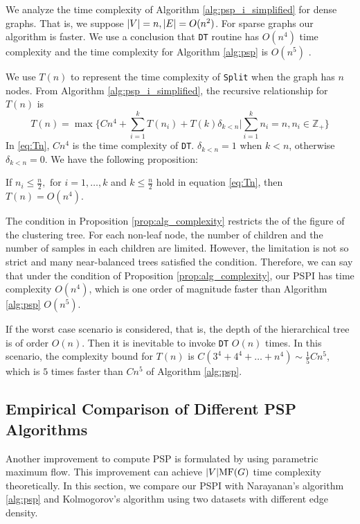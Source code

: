 We analyze the time complexity of Algorithm \ref{alg:psp_i_simplified} for dense graphs. That is, we suppose $\lvert V\rvert = n, \lvert E\rvert = O(n^2)$. For sparse graphs our algorithm is faster. We use a conclusion that \texttt{DT} routine has $O(n^4)$ time complexity and the time complexity for Algorithm \ref{alg:psp} is $O(n^5)$ \citep{pin}.

We use $T(n)$ to represent the time complexity of \texttt{Split} when the graph has $n$ nodes.
From Algorithm \ref{alg:psp_i_simplified}, the recursive relationship for $T(n)$ is
\begin{equation}\label{eq:Tn}
T(n) = \max \{ C n^4 + \sum_{i=1}^k T(n_i) + T(k)\delta_{k<n} | \sum_{i=1}^k n_i = n, n_i \in \mathbb{Z}_{+} \}
\end{equation}	
In \eqref{eq:Tn}, $Cn^4$ is the time complexity of \texttt{DT}. $\delta_{k<n} = 1$ when $k<n$, otherwise $\delta_{k<n}=0$. We have the following proposition:
\begin{proposition}\label{prop:alg_complexity}
	 If $n_i \leq \frac{n}{2}, \textrm{ for } i=1,\dots,k$ and $ k \leq \frac{n}{2}$  hold in equation \eqref{eq:Tn}, then $T(n) = O(n^4)$.
\end{proposition}

The condition in Proposition \ref{prop:alg_complexity} restricts the of the figure of the clustering tree. For each non-leaf node, the number of children and the number of samples in each children are limited. However, the limitation is not so strict and
many near-balanced trees satisfied the condition. Therefore, we can say that under the condition of Proposition \ref{prop:alg_complexity},
our PSPI has time complexity $O(n^4)$, which is one order of magnitude faster than Algorithm \ref{alg:psp} $O(n^5)$.

If the worst case scenario is considered, that is, the depth of the hierarchical tree is of order $O(n)$. Then it is inevitable to invoke \texttt{DT} $O(n)$ times.
In this scenario, the complexity bound for $T(n)$ is $C(3^4+4^4 + \dots + n^4) \sim \frac{1}{5}Cn^5$, which is $5$ times faster than $Cn^5$ of Algorithm \ref{alg:psp}.

\subsection{Empirical Comparison of Different PSP Algorithms}
Another improvement to compute PSP is formulated by \cite{kolmogorov} using parametric maximum flow.
This improvement can achieve $\lvert V\rvert \textrm{MF}(G)$ time complexity theoretically. 
In this section, we compare our PSPI with Narayanan's algorithm \ref{alg:psp} and Kolmogorov's algorithm
using two datasets with different edge density.

